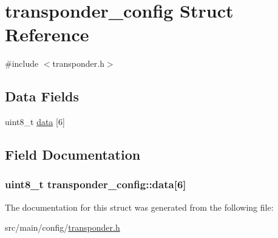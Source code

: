 \hypertarget{structtransponder__config}{\section{transponder\+\_\+config Struct Reference}
\label{structtransponder__config}
}


{\ttfamily \#include $<$transponder.\+h$>$}

\subsection*{Data Fields}
\begin{DoxyCompactItemize}
\item 
uint8\+\_\+t \hyperlink{structtransponder__config_a85b3869749366ef1dbe2ef8cf21647f4}{data} \mbox{[}6\mbox{]}
\end{DoxyCompactItemize}


\subsection{Field Documentation}
\hypertarget{structtransponder__config_a85b3869749366ef1dbe2ef8cf21647f4}{
\subsubsection[{data}]{\setlength{\rightskip}{0pt plus 5cm}uint8\+\_\+t transponder\+\_\+config\+::data\mbox{[}6\mbox{]}}}\label{structtransponder__config_a85b3869749366ef1dbe2ef8cf21647f4}


The documentation for this struct was generated from the following file\+:\begin{DoxyCompactItemize}
\item 
src/main/config/\hyperlink{transponder_8h}{transponder.\+h}\end{DoxyCompactItemize}
